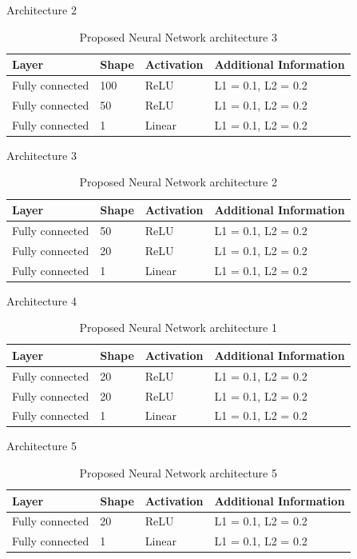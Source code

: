 \documentclass[12pt]{IEEEtran}%
\begin{document}
Architecture 2

\begin{table}[!htb]
\centering
\begin{tabular}{l l l l}
	\hline
	Layer & Shape & Activation & Additional Information\\
  	\hline
  	Fully connected & 100 & ReLU & L1 = 0.1, L2 = 0.2\\
  	Fully connected & 50 & ReLU & L1 = 0.1, L2 = 0.2\\
  	Fully connected & 1 & Linear & L1 = 0.1, L2 = 0.2\\
  	\hline
\end{tabular}
\caption{Proposed Neural Network architecture 3}
\label{table:proposed_nn_3}
\end{table}

Architecture 3

\begin{table}[!htb]
\centering
\begin{tabular}{l l l l}
	\hline
	Layer & Shape & Activation & Additional Information\\
  	\hline
  	Fully connected & 50 & ReLU & L1 = 0.1, L2 = 0.2\\
  	Fully connected & 20 & ReLU & L1 = 0.1, L2 = 0.2\\
  	Fully connected & 1 & Linear & L1 = 0.1, L2 = 0.2\\
  	\hline
\end{tabular}
\caption{Proposed Neural Network architecture 2}
\label{table:proposed_nn_2}
\end{table}

Architecture 4

\begin{table}[!htb]
\centering
\begin{tabular}{l l l l}
	\hline
	Layer & Shape & Activation & Additional Information\\
  	\hline
  	Fully connected & 20 & ReLU & L1 = 0.1, L2 = 0.2\\
  	Fully connected & 20 & ReLU & L1 = 0.1, L2 = 0.2\\
  	Fully connected & 1 & Linear & L1 = 0.1, L2 = 0.2\\
  	\hline
\end{tabular}
\caption{Proposed Neural Network architecture 1}
\label{table:proposed_nn_1}
\end{table}

Architecture 5

\begin{table}[!htb]
\centering
\begin{tabular}{l l l l}
	\hline
	Layer & Shape & Activation & Additional Information\\
  	\hline
  	Fully connected & 20 & ReLU & L1 = 0.1, L2 = 0.2\\
  	Fully connected & 1 & Linear & L1 = 0.1, L2 = 0.2\\
  	\hline
\end{tabular}
\caption{Proposed Neural Network architecture 5}
\label{table:proposed_nn_5}
\end{table}
\end{document}
